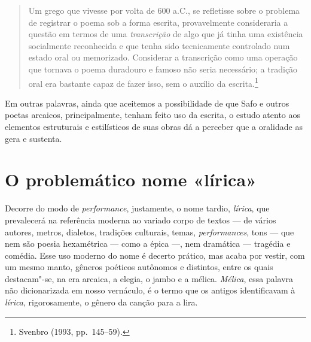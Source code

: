 \begin{quote}
Um grego que vivesse por volta de 600 a.C., se refletisse sobre o problema de
registrar o poema sob a forma escrita, provavelmente consideraria a questão em
termos de uma \textit{transcrição} de algo que já tinha uma existência
socialmente reconhecida e que tenha sido tecnicamente controlado num estado
oral ou memorizado. Considerar a transcrição como uma operação que tornava o
poema duradouro e famoso não seria necessário; a tradição oral era bastante
capaz de fazer isso, sem o auxílio da escrita.\footnote{ Svenbro (1993, pp.~145--59).}
\end{quote}

Em outras palavras, ainda que aceitemos a possibilidade de que Safo e outros
poetas arcaicos, principalmente, tenham feito uso da escrita, o estudo atento
aos elementos estruturais e estilísticos de suas obras dá a perceber que a oralidade as gera e
sustenta.

\section*{O problemático nome «lírica»}

Decorre do modo de \textit{performance}, justamente, o nome tardio,
\textit{lírica}, que prevalecerá na referência moderna ao variado corpo de
textos --- de vários autores, metros, dialetos, tradições culturais, temas,
\textit{performances}, tons --- que nem são poesia hexamétrica --- como a
épica ---, nem dramática --- tragédia e comédia. Esse uso moderno do nome é decerto
prático, mas acaba por vestir, com um mesmo manto,
gêneros poéticos autônomos e distintos, entre os quais destacam"-se, na era
arcaica, a elegia, o jambo e a mélica. \textit{Mélica}, essa palavra não
dicionarizada em nosso vernáculo, é o termo que os antigos identificavam à
\textit{lírica}, rigorosamente, o gênero da canção para a lira. 

